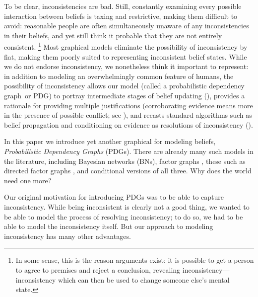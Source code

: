 \documentclass{article}
\newcommand{\modelname}{probabilistic dependency graph}
\newcommand{\MN}{PDG}
\numberwithin{equation}{section}
\begin{document}
\begin{notfocus}
{	
	To be clear, inconsistencies are bad. Still, constantly examining every possible interaction between beliefs is taxing and restrictive, making them difficult to avoid: reasonable people are often simultaneously unaware of any inconsistencies in their beliefs, and yet still think it probable that they are not entirely consistent.%
		\footnote{In some sense, this is the reason arguments exist: it is possible to get a person to agree to premises and reject a conclusion, revealing inconsistency---inconsistency which can then be used to change someone else's mental state. }		
	Most graphical models eliminate the possibility of inconsistency by fiat, 
	making them poorly suited to representing inconsistent belief states.
	While we do not endorse inconsistency, we nonetheless think it important to represent: in addition to modeling an overwhelmingly common feature of humans, the possibility of inconsistency 
	allows our model (called a \modelname\ or \MN)
	to portray intermediate stages of belief updating (), 
	provides a rationale for providing multiple justifications 
	(corroborating evidence means more in the presence of possible conflict; see ),
	and	recasts standard algorithms such as belief propagation and conditioning on evidence as resolutions of inconsistency (). }

In this paper we introduce yet another graphical for modeling beliefs,
\emph{Probabilistic Dependency Graphs} (PDGs).  
There are already many such models in the literature, including 
Bayesian networks (BNs), factor graphs \parencite{koller2009probabilistic},
these such as directed factor graphs \parencite{frey2012extending}, and conditional versions of all three.
Why does the world need one more?

Our original motivation for introducing PDGs was to be able to capture
inconsistency.  
While being inconsistent is clearly not a good thing,
we wanted to be able to model the process of resolving inconsistency;
to do so, we had to be able to model the inconsistency itself.  
But our approach to modeling inconsistency has many other advantages.
	

\end{notfocus}
\end{document}
